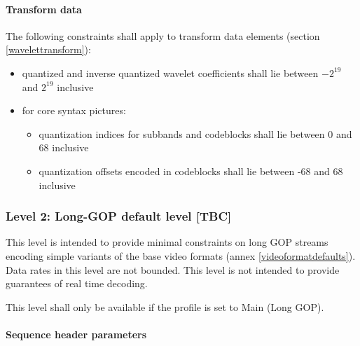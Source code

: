 \paragraph{Transform data\newline}

The following constraints shall apply to transform data elements 
(section \ref{wavelettransform}):
\begin{itemize}
\item quantized and inverse quantized wavelet coefficients shall lie 
between $-2^{19}$ and $2^{19}$ inclusive
\item for core syntax pictures:
    \begin{itemize}
    \item quantization indices for subbands and codeblocks shall lie between 
    0 and 68 inclusive 
    \item quantization offsets encoded in codeblocks shall lie between 
    -68 and 68 inclusive
    \end{itemize} 
\end{itemize} 

\subsubsection{Level 2: Long-GOP default level [TBC]}

This level is intended to provide minimal constraints on long GOP
streams encoding simple variants of the base video formats 
(annex \ref{videoformatdefaults}). 
Data rates in this level are not bounded. This level is not intended to provide
guarantees of real time decoding.

This level shall only be available if the profile is set to Main (Long GOP).

\paragraph{Sequence header parameters\newline}

